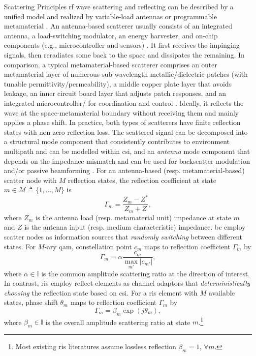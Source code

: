 \documentclass[journal,12pt,onecolumn,draftclsnofoot]{IEEEtran}
\theoremstyle{remark}
\begin{document}
\begin{section}{Scattering Principles}
	\gls{rf} wave scattering and reflecting can be described by a unified model and realized by {variable-load antennas} or {programmable metamaterial} \cite{Liang2022}.
	An antenna-based scatterer usually consists of an integrated antenna, a load-switching modulator, an energy harvester, and on-chip components (e.g., microcontroller and sensors) \cite{Dobkin2012}.
	It first receives the impinging signals, then reradiates some back to the space and dissipates the remaining.
	In comparison, a typical metamaterial-based scatterer comprises an outer metamaterial layer of numerous sub-wavelength metallic/dielectric patches (with tunable permittivity/permeability), a middle copper plate layer that avoids leakage, an inner circuit board layer that adjusts patch responses, and an integrated microcontroller/ for coordination and control \cite{Wu2020}.
	Ideally, it reflects the wave at the space-metamaterial boundary without receiving them and mainly applies a phase shift.
	In practice, both types of scatterers have {finite} reflection states with non-zero reflection loss.
	The scattered signal can be decomposed into a {structural} mode component that consistently contributes to environment multipath and can be modelled within \gls{csi}, and an \emph{antenna} mode component that depends on the impedance mismatch and can be used for backscatter modulation and/or passive beamforming \cite{Hansen1989}.
	For an antenna-based (resp. metamaterial-based) scatter node with $M$ reflection states, the reflection coefficient at state $m \in \mathcal{M} \triangleq \{1,\ldots,M\}$ is
	\begin{equation}
		\Gamma_m = \frac{Z_m - Z^*}{Z_m + Z},
		\label{eq:reflection_coefficient}
	\end{equation}
	where $Z_m$ is the antenna load (resp. metamaterial unit) impedance at state $m$ and $Z$ is the antenna input (resp. medium characteristic) impedance.
	\gls{bc} employ scatter nodes as information sources that \emph{randomly switching} between different states.
	For $M$-ary \gls{qam}, constellation point $c_m$ maps to reflection coefficient $\Gamma_m$ by \cite{Thomas2012a}
	\begin{equation}
		\Gamma_m = \alpha \frac{c_m}{\max_{m'} \lvert c_{m'} \rvert},
		\label{eq:backscatter_modulation}
	\end{equation}
	where $\alpha \in \mathbb{I}$ is the common amplitude scattering ratio at the direction of interest.
	In contrast, \gls{ris} employ reflect elements as channel adaptors that \emph{deterministically choosing} the reflection state based on \gls{csi}.
	For a \gls{ris} element with $M$ available states, phase shift $\theta_m$ maps to reflection coefficient $\Gamma_m$ by \cite{Wu2018}
	\begin{equation}
		\Gamma_m = \beta_m \exp(j \theta_m),
		\label{eq:passive_beamforming}
	\end{equation}
	where $\beta_m \in \mathbb{I}$ is the overall amplitude scattering ratio at state $m$.\footnote{Most existing \gls{ris} literatures assume lossless reflection $\beta_m=1$, $\forall m$.}
\end{section}
\end{document}
